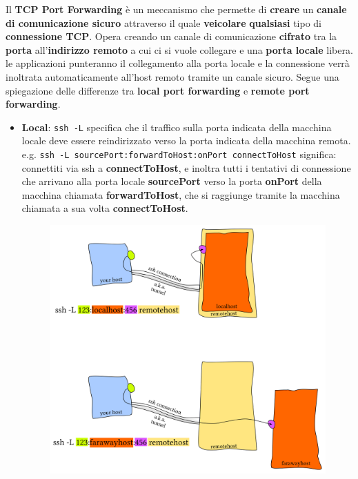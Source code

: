 \documentclass[11pt,a4paper]{article}
\theoremstyle{definition}
\begin{document}
Il \textbf{TCP Port Forwarding} è un meccanismo che permette di \textbf{creare} un \textbf{canale di comunicazione sicuro} attraverso il quale \textbf{veicolare} \textbf{qualsiasi} tipo di \textbf{connessione TCP}. Opera creando un canale di comunicazione \textbf{cifrato} tra la \textbf{porta} all’\textbf{indirizzo remoto} a cui ci si vuole collegare e una \textbf{porta locale} libera.  le applicazioni punteranno il collegamento alla porta locale e la connessione verrà inoltrata automaticamente all’host remoto
tramite un canale sicuro. \newline Segue una spiegazione delle differenze tra \textbf{local port forwarding} e \textbf{remote port forwarding}.
\newpage
\begin{itemize}
	\item \textbf{Local}: \texttt{ssh -L} specifica che il traffico sulla porta indicata della macchina locale deve essere reindirizzato verso la porta indicata della macchina remota. \newline
	      e.g. \texttt{ssh -L sourcePort:forwardToHost:onPort connectToHost} significa: connettiti via ssh a \textbf{connectToHost}, e inoltra tutti i tentativi di connessione che arrivano alla porta locale \textbf{sourcePort} verso la porta \textbf{onPort} della macchina chiamata \textbf{forwardToHost}, che si raggiunge tramite la macchina chiamata a sua volta \textbf{connectToHost}.
	      \begin{figure}[!h]
		      \includegraphics[scale=0.8]{Immagini/Local_ssh.png}

\end{figure}
\end{itemize}
\end{document}
